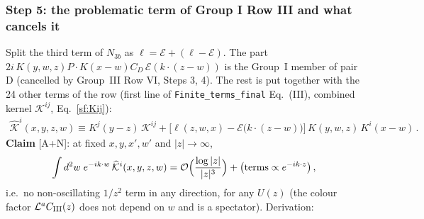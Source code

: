 \documentclass[10pt]{article}
\begin{document}
\subsubsection{Step 5: the problematic term of Group I Row III and what cancels it}
\noindent Split the third term of $N_{3b}$ as $\ell=\mathcal{E}+(\ell-\mathcal{E})$. The part $2i\,K(y,w,z)P\!\cdot\!K(x-w)C_{D}\,\mathcal{E}(k\cdot(z-w))$ is the Group~I member of pair D (cancelled by Group~III Row VI, Steps 3, 4). The rest is put together with the 24 other terms of the row (first line of \texttt{Finite\_terms\_final} Eq.~(III), combined kernel $\mathcal{K}^{ij}$, Eq.~\eqref{sf:Kij}):
\begin{align}
\widehat{\mathcal{K}}^{i}(x,y,z,w)\equiv K^{j}(y-z)\,\mathcal{K}^{ij}+\Big[\ell(z,w,x)-\mathcal{E}\big(k\cdot(z-w)\big)\Big]\,K(y,w,z)\,K^{i}(x-w)\,.\label{sf:Khat}
\end{align}
\textbf{Claim} [A+N]: at fixed $x,y,x',w'$ and $|z|\to\infty$,
\begin{align}
\int d^{2}w\;e^{-ik\cdot w}\,\widehat{\mathcal{K}}^{i}(x,y,z,w)={\cal O}\Big(\frac{\log|z|}{|z|^{3}}\Big)+\big(\text{terms}\propto e^{-ik\cdot z}\big)\,,\label{sf:claim}
\end{align}
i.e.\ no non-oscillating $1/z^{2}$ term in any direction, for any $U(z)$ (the colour factor $\mathcal{L}^{a}C_{\rm III}(z)$ does not depend on $w$ and is a spectator). Derivation:
\end{document}
